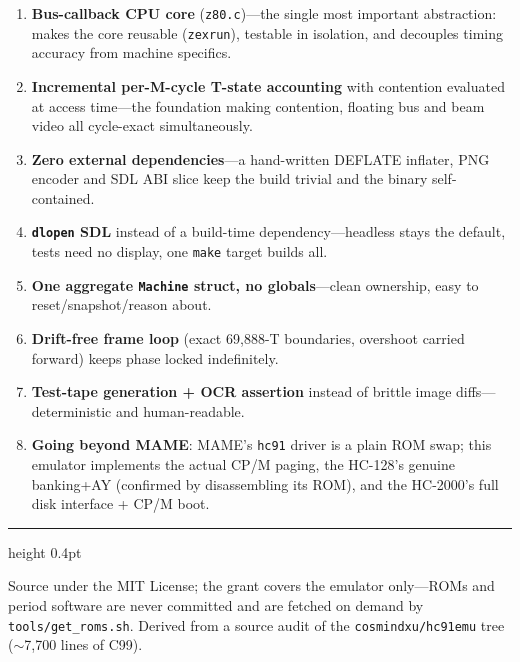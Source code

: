 \documentclass[11pt,a4paper]{article}
\begin{document}
\begin{enumerate}
\item \textbf{Bus-callback CPU core} (\texttt{z80.c})---the single most
      important abstraction: makes the core reusable (\texttt{zexrun}),
      testable in isolation, and decouples timing accuracy from machine specifics.
\item \textbf{Incremental per-M-cycle T-state accounting} with contention
      evaluated at access time---the foundation making contention, floating bus
      and beam video all cycle-exact simultaneously.
\item \textbf{Zero external dependencies}---a hand-written DEFLATE inflater,
      PNG encoder and SDL ABI slice keep the build trivial and the binary
      self-contained.
\item \textbf{\texttt{dlopen} SDL} instead of a build-time dependency---headless
      stays the default, tests need no display, one \texttt{make} target builds all.
\item \textbf{One aggregate \texttt{Machine} struct, no globals}---clean
      ownership, easy to reset/snapshot/reason about.
\item \textbf{Drift-free frame loop} (exact 69{,}888-T boundaries, overshoot
      carried forward) keeps phase locked indefinitely.
\item \textbf{Test-tape generation + OCR assertion} instead of brittle image
      diffs---deterministic and human-readable.
\item \textbf{Going beyond MAME}: MAME's \texttt{hc91} driver is a plain ROM
      swap; this emulator implements the actual CP/M paging, the HC-128's genuine
      banking+AY (confirmed by disassembling its ROM), and the HC-2000's full
      disk interface + CP/M boot.
\end{enumerate}

\vspace{2pt}\hrule height 0.4pt
\begin{center}\footnotesize
Source under the MIT License; the grant covers the emulator only---ROMs and
period software are never committed and are fetched on demand by
\texttt{tools/get\_roms.sh}. Derived from a source audit of the
\texttt{cosmindxu/hc91emu} tree ($\sim$7{,}700 lines of C99).
\end{center}
\end{document}
